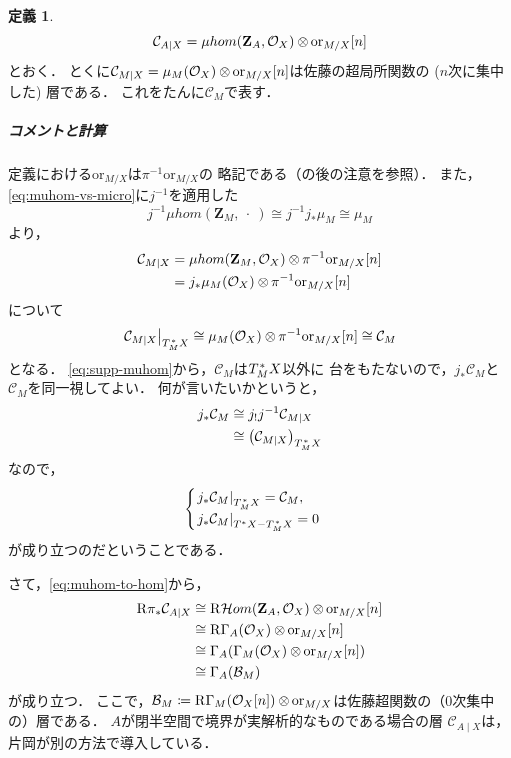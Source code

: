 \documentclass[leqno, 10pt, a4paper, dvipdfmx]{jsarticle}
\theoremstyle{definition}
\newcommand{\zz}{\mathbf{Z}}
\newcommand{\mcal}{\mathcal}
\numberwithin{equation}{section}
\newcommand{\cO}{\mcal{O}}
\newcommand{\HOM}{\mathop{\mathcal{H}\hspace{-0pt}om}\nolimits}%
\newcommand{\RHOM}{\mathop{\mathrm{R}\hspace{-1.5pt}\HOM}\nolimits}
\newcommand{\RG}{\mathop{\mathrm{R}\hspace{-0pt}\Gamma}\nolimits}
\newcommand{\Rder}{\mathrm{R}}
\newcommand{\ori}{\mathord{\mathrm{or}}}
\newcommand{\tens}[1][]{\mathbin{\otimes_{\raise1.5ex\hbox to-.1em{}{#1}}}}
\newcommand{\blk}{\mathord{\ \cdot\ }}
\newcommand{\mres}[2][]{{\left.{#1}\right\rvert}_{#2}}
\theoremstyle{mystyle}
\newtheorem{DFN}[AXM]{定義}
\newcommand{\cotb}[1][]{T^{\ast}{#1}}
\newcommand{\conm}[2][]{T_{#1}^{\hspace{0.7pt}\ast}{#2}}
\newcommand{\muhom}{\mu hom}
\newcommand{\micro}[1]{\mu_{#1}\hspace{0pt}}
\newcommand{\hfun}[1][]{\mathcal{B}_{#1}}
\newcommand{\mfun}[1][]{\mathcal{C}_{#1}}
\begin{document}
\begin{DFN}
    \[
        \mfun[A\mid X]=\muhom(\zz_A,\cO_X)\tens[]\ori_{M/X}[n]
    \]
    とおく．
    とくに\(
        \mfun[M\mid X]
        =\micro{M}(\cO_X)\tens[]\ori_{M/X}[n]
    \)は佐藤の超局所関数の (\(n\)次に集中した) 層である．
    これをたんに\({\mfun[M]}\)で表す．
\end{DFN}
\subparagraph{コメントと計算}
定義における\(\ori_{M/X}\)は\(\pi^{-1}\ori_{M/X}\)の
略記である（\cite[定義11.5.1]{KS90}の後の注意を参照）．
また，\eqref{eq:muhom-vs-micro}に\(j^{-1}\)を適用した
\[
    j^{-1}\muhom(\zz_M,\blk)\cong j^{-1}j_{\ast}\micro{M}\cong\micro{M}
\]
より，
\begin{align*}
    \mfun[M\mid X]
    &=\muhom(\zz_M,\cO_X)\tens[]\pi^{-1}\ori_{M/X}[n]\\
    &=j_{\ast}\micro{M}(\cO_X)\tens[]\pi^{-1}\ori_{M/X}[n]
\end{align*}
について
\[
    \mres[{\mfun[M\mid X]}]{\conm[M]{X}}
    \cong
    \micro{M}(\cO_X)\tens[]\pi^{-1}\ori_{M/X}[n]
    \cong
    \mfun[M]
\]
となる．
\eqref{eq:supp-muhom}から，\(\mfun[M]\)は\(\conm[M]{X}\)以外に
台をもたないので，\(j_{\ast}\mfun[M]\)と\(\mfun[M]\)を同一視してよい．
何が言いたいかというと，
\begin{align*}
    j_{\ast}\mfun[M]
    &\cong j_{!}j^{-1}\mfun[M\mid X]\\
    &\cong \left(\mfun[M\mid X]\right)_{\conm[M]{X}}
\end{align*}
なので，
\[\begin{cases}
    \mres[{j_{\ast}\mfun[M]}]{\conm[M]{X}}=\mfun[M],\\
    \mres[{j_{\ast}\mfun[M]}]{\cotb[X]-\conm[M]{X}}=0
\end{cases}\]
が成り立つのだということである．

さて，\eqref{eq:muhom-to-hom}から，
\begin{align*}
    \Rder{\pi_{\ast}}\mfun[A\mid X]
    &\cong
    \RHOM(\zz_A,\cO_X)\tens[]\ori_{M/X}[n]\\
    &\cong
    \RG_{A}(\cO_X)\tens[]\ori_{M/X}[n]\\
    &\cong 
    \Gamma_{A}(\Gamma_{M}(\cO_X)\tens[]\ori_{M/X}[n])\\
    &\cong 
    \Gamma_{A}(\hfun[M])
\end{align*}
が成り立つ．
ここで，\(
    \hfun[M]\coloneqq \RG_{M}(\cO_X[n])\tens[]\ori_{M/X}
\)は佐藤超関数の（\(0\)次集中の）層である．
\(A\)が閉半空間で境界が実解析的なものである場合の層
\(\mfun[A\mid X]\)は，片岡が別の方法で導入している．
\end{document}
